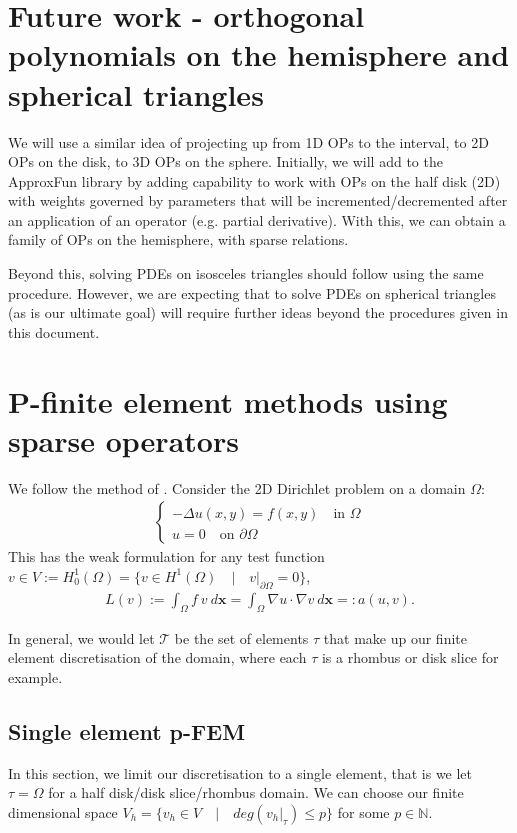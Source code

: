 \documentclass[11pt, oneside]{article}   	%
\newcommand{\N}{\mathbb{N}}
\newcommand{\element}{\tau}
\newcommand{\FEset}{\mathcal{T}}
\begin{document}
%
\section{Future work - orthogonal polynomials on the hemisphere and spherical triangles}

We will use a similar idea of projecting up from 1D OPs to the interval, to 2D OPs on the disk, to 3D OPs on the sphere. Initially, we will add to the ApproxFun library by adding capability to work with OPs on the half disk (2D) with weights governed by parameters that will be incremented/decremented after an application of an operator (e.g. partial derivative). With this, we can obtain a family of OPs on the hemisphere, with sparse relations.

Beyond this, solving PDEs on isosceles triangles should follow using the same procedure. However, we are expecting that to solve PDEs on spherical triangles (as is our ultimate goal) will require further ideas beyond the procedures given in this document.

%
\appendix
%
\section{P-finite element methods using sparse operators}

We follow the method of \cite{beuchler2006new}. Consider the 2D Dirichlet problem on a domain $\Omega$:
\begin{align}
	\begin{cases}
         - \Delta u(x,y) = f(x,y) \quad \text{in } \Omega \\
         u = 0 \quad \text{on } \partial \Omega
         \end{cases}
\end{align}
This has the weak formulation for any test function $v \in V := H_0^1(\Omega) = \{v \in H^1(\Omega) \quad | \quad v|_{\partial \Omega} = 0 \}$,
\begin{align}
	L(v) := \int_\Omega f \: v \: d\mathbf{x} = \int_\Omega \nabla u \cdot \nabla v \: d\mathbf{x} =: a(u,v).
\end{align}

In general, we would let $\FEset$ be the set of elements $\element$ that make up our finite element discretisation of the domain, where each $\element$ is a rhombus or disk slice for example. 

\subsection{Single element p-FEM}
In this section, we limit our discretisation to a single element, that is we let $\element = \Omega$ for a half disk/disk slice/rhombus domain. We can choose our finite dimensional space $V_h = \{v_h \in V \quad | \quad deg(v_h|_\element) \le p\}$ for some $p \in \N$.
\end{document}
